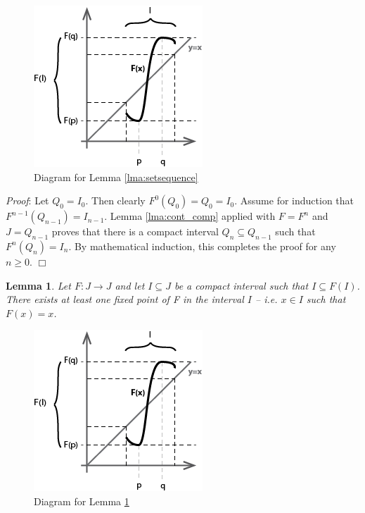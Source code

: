 \documentclass[12pt]{IEEEtran}
\newtheorem{lma}{Lemma}
\begin{document}
\begin{figure}
	\begin{center}
		\includegraphics{img/fixedpoint_graph.png}
		\caption{Diagram for Lemma \ref{lma:setsequence}}
        \label{fig:setsequence_graph}
	\end{center}
\end{figure}

{\it Proof}: Let $Q_0 = I_0$. Then clearly $F^0 \left( Q_0 \right) = Q_0 = I_0$. Assume for induction that $F^{n-1} \left( Q_{n-1} \right) = I_{n-1}$. Lemma \ref{lma:cont_comp} applied with $F = F^n$ and $J = Q_{n-1}$ proves that there is a compact interval $Q_n \subseteq Q_{n-1}$ such that $F^n \left( Q_n \right) = I_n$. By mathematical induction, this completes the proof for any $n \geq 0$. $\Box$

\begin{lma}
\label{lma:fixedpoint}
	Let $F : J \rightarrow J$ and let $I \subseteq J$ be a compact interval such that $I \subseteq F \left( I \right)$. There exists at least one fixed point of F in the interval $I$ -- i.e. $x \in I$ such that $F \left( x \right) = x$.
\end{lma}

\begin{figure}
	\begin{center}
		\includegraphics{img/fixedpoint_graph.png}
		\caption{Diagram for Lemma \ref{lma:fixedpoint}}
        \label{fig:fixedpoint_graph}
	\end{center}
\end{figure}
\end{document}
